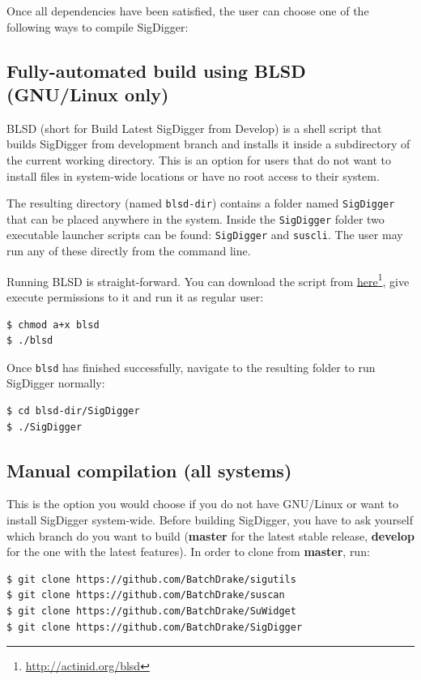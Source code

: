 \documentclass{ol-softwaremanual}
\newcommand{\doclink}[2]{\href{#1}{#2}\footnote{\url{#1}}}
\begin{document}
Once all dependencies have been satisfied, the user can choose one of the following ways to compile SigDigger:

\subsection{Fully-automated build using BLSD (GNU/Linux only)}
BLSD (short for Build Latest SigDigger from Develop) is a shell script that builds SigDigger from development branch and installs it inside a subdirectory of the current working directory.  This is an option for users that do not want to install files in system-wide locations or have no root access to their system. 

The resulting directory (named \texttt{blsd-dir}) contains a folder named \texttt{SigDigger} that can be placed anywhere in the system. Inside the \texttt{SigDigger} folder two executable launcher scripts can be found: \texttt{SigDigger} and \texttt{suscli}. The user may run any of these directly from the command line.

Running BLSD is straight-forward. You can download the script from \doclink{http://actinid.org/blsd}{here}, give execute permissions to it and run it as regular user:

\begin{lstlisting}
$ chmod a+x blsd
$ ./blsd
\end{lstlisting}

Once \texttt{blsd} has finished successfully, navigate to the resulting folder to run SigDigger normally:

\begin{lstlisting}
$ cd blsd-dir/SigDigger
$ ./SigDigger
\end{lstlisting}

\subsection{Manual compilation (all systems)}
This is the option you would choose if you do not have GNU/Linux or want to install SigDigger system-wide. Before building SigDigger, you have to ask yourself which branch do you want to build (\textbf{master} for the latest stable release, \textbf{develop} for the one with the latest features). In order to clone from \textbf{master}, run:

\begin{lstlisting}
$ git clone https://github.com/BatchDrake/sigutils
$ git clone https://github.com/BatchDrake/suscan
$ git clone https://github.com/BatchDrake/SuWidget
$ git clone https://github.com/BatchDrake/SigDigger
\end{lstlisting}
\end{document}
